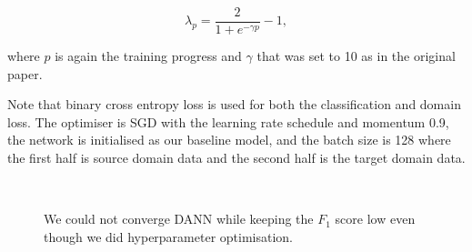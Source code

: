 \begin{equation}
	\lambda_p = \frac{2}{1 + e^{-\gamma p}} - 1,
\end{equation}

where \(p\) is again the training progress
and \(\gamma\) that was set to 10 as in the original paper.

Note that binary cross entropy loss is used for both the classification and domain loss.
The optimiser is SGD with the learning rate schedule and momentum 0.9,
the network is initialised as our baseline model,
and the batch size is 128
where the first half is source domain data and the second half is the target domain data.

\begin{figure}
\begin{center}
\\
\end{center}
\caption[Training of Domain-Adversarial Neural Network]{
	We could not converge DANN while keeping the \(F_1\) score low
	even though we did hyperparameter optimisation.
}
\label{dann_training}
\end{figure}

